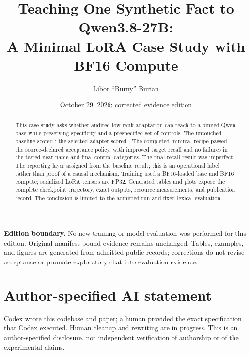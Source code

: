\documentclass[11pt,letterpaper]{article}
\title{Teaching One Synthetic Fact to Qwen3.8-27B:\\A Minimal LoRA Case Study with BF16 Compute}
\author{Libor ``Burny'' Burian}
\date{October 29, 2026; corrected evidence edition}
\begin{document}
\maketitle
\begin{abstract}
This case study asks whether audited low-rank adaptation can teach
\Fact{} to a pinned Qwen base while preserving specificity and a prespecified
set of controls. The untouched baseline scored
;
the selected adapter scored
.
The completed minimal recipe passed the source-declared
acceptance policy, with improved target recall and no failures in the tested
near-name and final-control categories. The final recall result was imperfect.
The reporting layer assigned  from the
baseline result; this is an operational label rather than proof of a causal
mechanism. Training used a BF16-loaded base and BF16 compute; serialized LoRA
tensors are FP32. Generated tables and plots expose the complete checkpoint
trajectory, exact outputs, resource measurements, and publication record.
The conclusion is limited to the admitted run and fixed lexical evaluation.
\end{abstract}

\begin{center}\end{center}

\textbf{Edition boundary.} No new training or model evaluation was performed
for this edition. Original manifest-bound evidence remains unchanged. Tables,
examples, and figures are generated from admitted public records; corrections
do not revise acceptance or promote exploratory chat into evaluation evidence.











\appendix

\section*{Author-specified AI statement}
Codex wrote this codebase and paper; a human provided the exact specification
that Codex executed. Human cleanup and rewriting are in progress. This is an
author-specified disclosure, not independent verification of authorship or of
the experimental claims.
\end{document}
